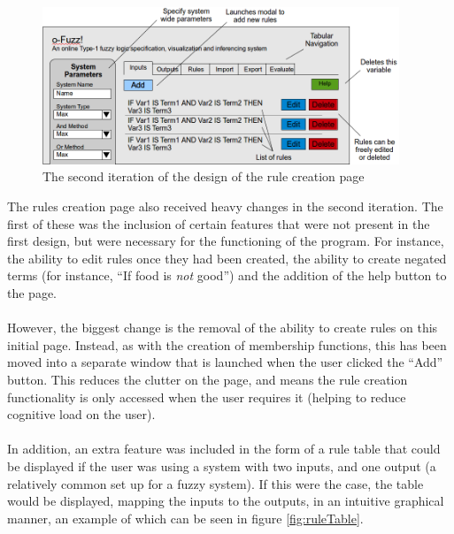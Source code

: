 \begin{figure}[ht!]
\begin{center}
\includegraphics[width=0.95\textwidth]{images/secondItRules}
\end{center}
\caption{The second iteration of the design of the rule creation page}
\label{fig:design-secondIterationRules}
\end{figure}
\noindent 
The rules creation page also received heavy changes in the second iteration. The first of these was the inclusion of certain features that were not present in the first design, but were necessary for the functioning of the program. For instance, the ability to edit rules once they had been created, the ability to create negated terms (for instance, ``If food is \textit{not} good'') and the addition of the help button to the page.\ \\
\ \\
However, the biggest change is the removal of the ability to create rules on this initial page. Instead, as with the creation of membership functions, this has been moved into a separate window that is launched when the user clicked the ``Add'' button. This reduces the clutter on the page, and means the rule creation functionality is only accessed when the user requires it (helping to reduce cognitive load on the user).\ \\
\ \\
In addition, an extra feature was included in the form of a rule table that could be displayed if the user was using a system with two inputs, and one output (a relatively common set up for a fuzzy system). If this were the case, the table would be displayed, mapping the inputs to the outputs, in an intuitive graphical manner, an example of which can be seen in figure \ref{fig:ruleTable}.


